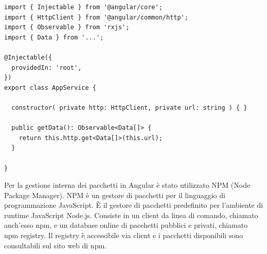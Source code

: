\begin{lstlisting}[caption={Esempio di un Service in Angular}, style=javaScriptCode]
import { Injectable } from '@angular/core';
import { HttpClient } from '@angular/common/http';
import { Observable } from 'rxjs';
import { Data } from '...';

@Injectable({
  providedIn: 'root',
})
export class AppService {

  constructor( private http: HttpClient, private url: string ) { }
  
  public getData(): Observable<Data[]> {
    return this.http.get<Data[]>(this.url);
  }

}
\end{lstlisting}
Per la gestione interna dei pacchetti in Angular è stato utilizzato NPM (Node Package Manager). NPM è un gestore di pacchetti per il linguaggio di programmazione JavaScript. È il gestore di pacchetti predefinito per l'ambiente di runtime JavaScript Node.js. Consiste in un client da linea di comando, chiamato anch'esso npm, e un database online di pacchetti pubblici e privati, chiamato npm registry.
Il registry è accessibile via client e i pacchetti disponibili sono consultabili sul sito web di npm. \cite{NPM}

